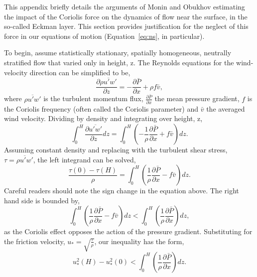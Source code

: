 \label{appendix:coriolis}

This appendix briefly details the arguments of Monin and
Obukhov\cite{monin1954basic} estimating the impact of the Coriolis
force on the dynamics of flow near the surface, in the so-called Eckman
layer. This section provides justification for the neglect of this force
in our equations of motion (Equation~\ref{eq:ns}, in particular). 

To begin, assume statistically stationary, spatially homogeneous,
neutrally stratified flow that varied only in height, z. The Reynolds
equations for the wind-velocity direction can be simplified to be,  
\begin{equation}
 \frac{\partial \overline{\rho u'w'}}{\partial z} = -\frac{\partial
  \bar P}{\partial x} + \rho f \bar v, 
\end{equation}
where $\overline{\rho u'w'}$ is the turbulent momentum flux, $\frac{\partial
\bar P}{\partial x} $  the mean pressure gradient, $f$ is the Coriolis
frequency (often called the Coriolis parameter) and $\bar v$ the
averaged wind velocity. Dividing by density and integrating over height,
z,  
\begin{equation}
 \int_0^H \frac{\partial \overline{u'w'}}{\partial z} dz = \int_0^H
  \left( -\frac{1}{\rho} \frac{\partial \bar P}{\partial x} + f \bar v
  \right) dz.  
\end{equation}
Assuming constant density and replacing with the turbulent shear stress,
$\tau = \overline{\rho u'w'}$, the left integrand can be solved,  
\begin{equation}
\frac{\tau(0) - \tau(H)}{\rho} = \int_0^H
  \left( \frac{1}{\rho} \frac{\partial \bar P}{\partial x} - f \bar v
  \right) dz.  
\end{equation}
Careful readers should note the sign change in the equation above. The
right hand side is bounded by, 
\begin{equation}
\int_0^H  \left( \frac{1}{\rho} \frac{\partial \bar P}{\partial x} - f \bar v
  \right) dz < \int_0^H  \left( \frac{1}{\rho} \frac{\partial \bar
  P}{\partial x}  \right) dz,
\end{equation}
as the Coriolis effect opposes the action of the pressure
gradient. Substituting for the friction velocity, $u_* =
\sqrt{\frac{\tau}{\rho}}$, our inequality has the form,
\begin{equation}
u^2_*(H) - u^2_*(0)  < \int_0^H  \left( \frac{1}{\rho} \frac{\partial
				  \bar P}{\partial x}  \right) dz. 
\label{eq:cor_f}
\end{equation}
